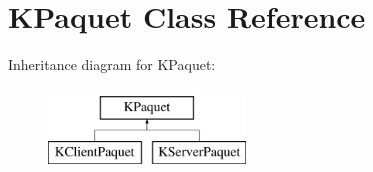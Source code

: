 \hypertarget{class_k_paquet}{\section{\-K\-Paquet \-Class \-Reference}
\label{class_k_paquet}
}
\-Inheritance diagram for \-K\-Paquet\-:\begin{figure}[H]
\begin{center}
\leavevmode
\includegraphics[height=2.000000cm]{class_k_paquet}
\end{center}
\end{figure}
